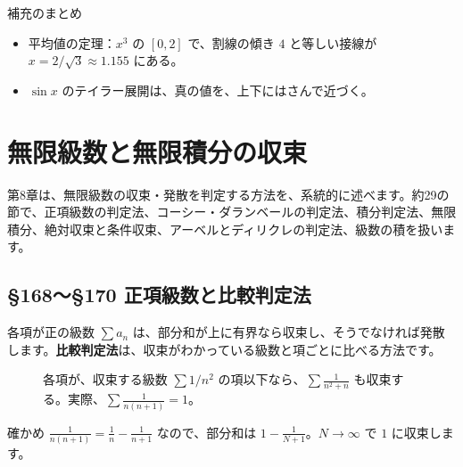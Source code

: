 \documentclass[a4paper,11pt,openany]{ltjsbook}
\begin{document}
\begin{pointbox}{補充のまとめ}
\begin{itemize}[leftmargin=*]
\item 平均値の定理：$x^3$ の $[0,2]$ で、割線の傾き $4$ と等しい接線が $x=2/\sqrt3\approx1.155$ にある。
\item $\sin x$ のテイラー展開は、真の値を、上下にはさんで近づく。
\end{itemize}
\end{pointbox}

\chapter{無限級数と無限積分の収束}

第8章は、無限級数の収束・発散を判定する方法を、系統的に述べます。約29の節で、正項級数の判定法、コーシー・ダランベールの判定法、積分判定法、無限積分、絶対収束と条件収束、アーベルとディリクレの判定法、級数の積を扱います。

\section{§168〜§170 正項級数と比較判定法}

各項が正の級数 $\sum a_n$ は、部分和が上に有界なら収束し、そうでなければ発散します。\textbf{比較判定法}は、収束がわかっている級数と項ごとに比べる方法です。

\begin{figure}[htbp]
\centering
{}
\caption{各項が、収束する級数 $\sum1/n^2$ の項以下なら、$\sum\frac{1}{n^2+n}$ も収束する。実際、$\sum\frac1{n(n+1)}=1$。}
\end{figure}

\begin{examplebox}{確かめ}
$\frac{1}{n(n+1)}=\frac1n-\frac1{n+1}$ なので、部分和は $1-\frac1{N+1}$。$N\to\infty$ で $1$ に収束します。
\end{examplebox}
\end{document}
